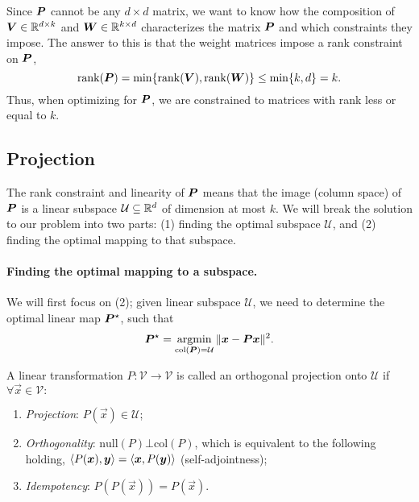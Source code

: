 \begin{important}
    Since $\bm{P}$ cannot be any $d\times d$ matrix, we want to know how the composition of $\bm{V}
        \in \mathbb{R}^{d\times k}$ and $\bm{W} \in \mathbb{R}^{k\times d}$ characterizes the matrix $\bm{P}$ and which
    constraints they impose. The answer to this is that the weight matrices impose a rank constraint on
    $\bm{P}$, \[
        \mathrm{rank}(\bm{P}) = \min \{ \mathrm{rank}(\bm{V}), \mathrm{rank}(\bm{W}) \} \leq \min \{ k, d \} = k.
    \]
    Thus, when optimizing for $\bm{P}$, we are constrained to matrices with rank less or equal to $k$.
\end{important}

\subsection{Projection}

The rank constraint and linearity of $\bm{P}$ means that the image (column space) of $\bm{P}$ is
a linear subspace $\mathcal{U} \subseteq \mathbb{R}^d$ of dimension at most $k$. We will break the solution
to our problem into two parts: (1) finding the optimal subspace $\mathcal{U}$, and (2) finding the
optimal mapping to that subspace.

\paragraph{Finding the optimal mapping to a subspace.}

We will first focus on (2); given linear subspace $\mathcal{U}$, we need to determine the optimal
linear map $\bm{P}^\star$, such that \[
    \bm{P}^\star = \operatorname*{argmin}_{\mathrm{col}(\bm{P}) = \mathcal{U}} \| \bm{x} - \bm{P}\bm{x} \|^2.
\]

\begin{definition}
    \label{def:orthogonal-projection}

    A linear transformation $P: \mathcal{V} \to \mathcal{V}$ is called an orthogonal projection onto
    $\mathcal{U}$ if $\forall \vec{x}\in \mathcal{V}:$
    \begin{enumerate}
        \item \textit{Projection}: $P(\vec{x}) \in \mathcal{U}$;
        \item \textit{Orthogonality}: $\mathrm{null}(P) \bot \mathrm{col}(P)$, which is equivalent to
              the following holding, $\langle P(\bm{x}), \bm{y} \rangle = \langle \bm{x},P(\bm{y}) \rangle$ (self-adjointness);
        \item \textit{Idempotency}: $P(P(\vec{x})) = P(\vec{x})$.
    \end{enumerate}
\end{definition}

